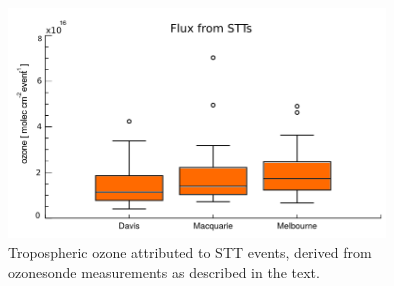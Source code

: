 \documentclass[acp, manuscript]{copernicus} %
\begin{document}
  \begin{figure}[t]
    \includegraphics[width=10cm]{figures/flux_absolute.png}
    \caption{Tropospheric ozone attributed to STT events, derived from ozonesonde measurements as described in the text.}
    \label{fig:fluxsummaryabs}
  \end{figure}
\end{document}

